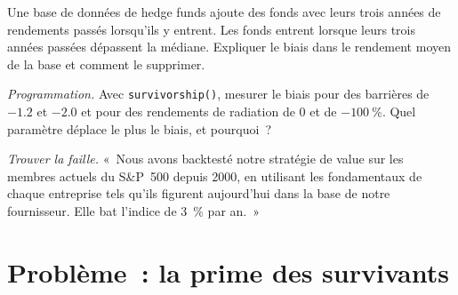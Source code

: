 \begin{exercise}[$\star\star$]\label{exo:rs:point-in-time-data-and-the-biases:6}
Une base de données de hedge funds ajoute des fonds avec leurs trois années de rendements passés lorsqu'ils y entrent. Les fonds entrent lorsque leurs trois années passées
dépassent la médiane. Expliquer le biais dans le rendement moyen de la base et comment le supprimer.
\end{exercise}

\begin{exercise}[$\star\star\star$]\label{exo:rs:point-in-time-data-and-the-biases:7}
\emph{Programmation.} Avec \texttt{survivorship()}, mesurer le biais pour des barrières de $-1.2$ et $-2.0$ et pour des rendements de radiation de $0$
et de $-100~\%$. Quel paramètre déplace le plus le biais, et pourquoi~?
\end{exercise}

\begin{exercise}[$\star\star\star$]\label{exo:rs:point-in-time-data-and-the-biases:8}
\emph{Trouver la faille.} «~Nous avons backtesté notre stratégie de value sur les membres actuels du S\&P~500 depuis 2000, en utilisant les fondamentaux de chaque entreprise
tels qu'ils figurent aujourd'hui dans la base de notre fournisseur. Elle bat l'indice de 3~\% par an.~»
\end{exercise}

\section{Problème~: la prime des survivants}

